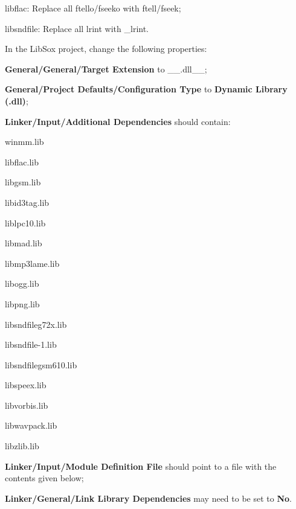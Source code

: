 \begin{DoxyItemize}
\item libflac\+: Replace all {\ttfamily ftello}/{\ttfamily fseeko} with {\ttfamily ftell}/{\ttfamily fseek};
\item libsndfile\+: Replace all lrint with \+\_\+lrint.
\item In the Lib\+Sox project, change the following properties\+:
\begin{DoxyItemize}
\item {\bfseries General/\+General/\+Target Extension} to \+\_\+\+\_\+.\+dll\+\_\+\+\_\+;
\item {\bfseries General/\+Project Defaults/\+Configuration Type} to {\bfseries Dynamic Library (.dll)};
\item {\bfseries Linker/\+Input/\+Additional Dependencies} should contain\+:
\begin{DoxyItemize}
\item {\ttfamily winmm.\+lib}
\item {\ttfamily libflac.\+lib}
\item {\ttfamily libgsm.\+lib}
\item {\ttfamily libid3tag.\+lib}
\item {\ttfamily liblpc10.\+lib}
\item {\ttfamily libmad.\+lib}
\item {\ttfamily libmp3lame.\+lib}
\item {\ttfamily libogg.\+lib}
\item {\ttfamily libpng.\+lib}
\item {\ttfamily libsndfileg72x.\+lib}
\item {\ttfamily libsndfile-\/1.\+lib}
\item {\ttfamily libsndfilegsm610.\+lib}
\item {\ttfamily libspeex.\+lib}
\item {\ttfamily libvorbis.\+lib}
\item {\ttfamily libwavpack.\+lib}
\item {\ttfamily libzlib.\+lib}
\end{DoxyItemize}
\item {\bfseries Linker/\+Input/\+Module Definition File} should point to a file with the contents given below;
\item {\bfseries Linker/\+General/\+Link Library Dependencies} may need to be set to {\bfseries No}.
\end{DoxyItemize}
\end{DoxyItemize}


